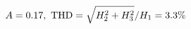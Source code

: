 \documentclass[preview]{standalone}
\begin{document}
\begin{align*}
\special{dvisvgm:raw <g id='unique000'>}A=0.17,\ \text{THD}=\sqrt{H_2^2+H_3^2}/H_1=3.3\%\special{dvisvgm:raw </g>}
\end{align*}
\end{document}
